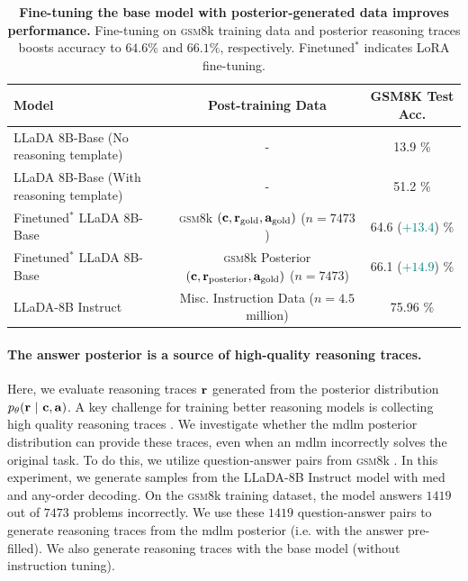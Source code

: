 \begin{table}[h]
\centering
\small
\begin{tabular}{lcc}
\toprule
\textbf{Model} & \textbf{Post-training Data} & \textbf{GSM8K Test Acc.} \\
\midrule
LLaDA 8B-Base (No reasoning template) & - & 13.9 \% \\
LLaDA 8B-Base (With reasoning template) & - & 51.2  \% \\
\midrule
Finetuned$^*$ LLaDA 8B-Base & \textsc{gsm8}k $(\mathbf{c}, \mathbf{r}_\text{gold}, \mathbf{a}_\text{gold})$ ($n=7473$) & 64.6 (\textcolor{teal}{$+13.4$})  \% \\
Finetuned$^*$ LLaDA 8B-Base & \textsc{gsm8}k Posterior $(\mathbf{c}, \mathbf{r}_\text{posterior}, \mathbf{a}_\text{gold})$ ($n=7473$) & {66.1} (\textcolor{teal}{$+14.9$})  \% \\
\midrule 
LLaDA-8B Instruct & Misc. Instruction Data ($n=4.5$ million) & 75.96  \% \\ 
\bottomrule
\end{tabular}
\caption{\textbf{Fine-tuning the base model with posterior-generated data improves performance.} 
Fine-tuning on \textsc{gsm8}k training data and posterior reasoning traces boosts accuracy to $64.6\%$ and $66.1\%$, respectively. Finetuned$^*$ indicates LoRA \citep{hu2022lora} fine-tuning.}
\label{tab:finetune_gsm8k}
\end{table}




\paragraph{The answer posterior is a source of high-quality reasoning traces.} 

Here, we evaluate reasoning traces $\mathbf{r}$ generated from the posterior distribution $p_\theta(\mathbf{r} ~\vert~ \mathbf{c}, \mathbf{a})$. A key challenge for training better reasoning models is collecting high quality reasoning traces \citep{zelikman2022star}. We investigate whether the  \gls{mdlm}  posterior distribution can provide these traces, even when an \gls{mdlm} incorrectly solves the original task.
To do this, we utilize question-answer pairs from \textsc{gsm8}k \citep{lightman2023letsverifystepstep}. In this experiment, we generate samples from the LLaDA-8B Instruct model with \gls{med} and any-order decoding. On the \textsc{gsm8}k training dataset, the model answers $1419$ out of $7473$ problems incorrectly. We use these $1419$ question-answer pairs to generate reasoning traces from the \gls{mdlm} posterior (i.e. with the answer pre-filled). We also generate reasoning traces with the base model (without instruction tuning).

